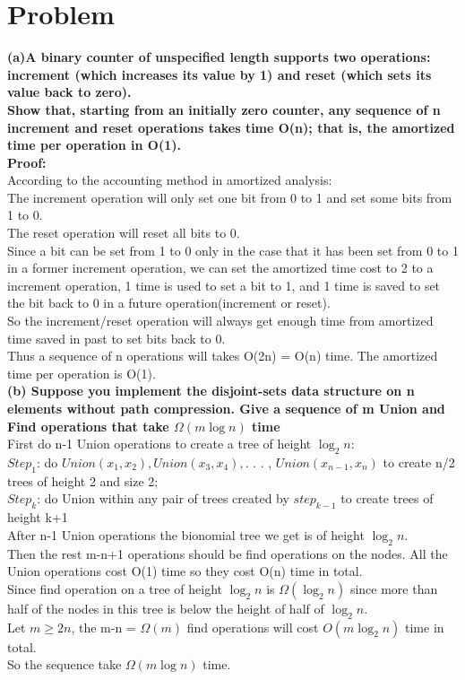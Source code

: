 \documentclass{article}
\begin{document}
\section{Problem \uppercase\expandafter{}}
\textbf{(a)A binary counter of unspecified length supports two operations: increment
(which increases its value by 1) and reset (which sets its value back to zero).\\
 Show that,
starting from an initially zero counter, any sequence of n increment and reset operations
takes time O(n); that is, the amortized time per operation in O(1).}\\
\textbf{Proof:}\\
According to the accounting method in amortized analysis:\\
The increment operation will only set one bit from 0 to 1 and set some bits from 1 to 0.\\
The reset operation will reset all bits to 0.\\
Since a bit can be set from 1 to 0 only in the case that it has been set from 0 to 1 in a former increment operation, we can set the amortized time cost to 2 to a increment operation, 1 time is used to set a bit to 1, and 1 time is saved to set the bit back to 0 in a future operation(increment or reset).\\
So the increment/reset operation will always get enough time from amortized time saved in past to set bits back to 0.\\
Thus a sequence of n operations will takes O(2n) = O(n) time. The amortized time per operation is O(1).\\
\textbf{(b) Suppose you implement the disjoint-sets data structure on n elements without path compression. Give a sequence of m Union and Find operations that take $\Omega(m \log n)$ time}\\
First do n-1 Union operations to create a tree of height $\log_2 n$:\\
$Step_1$: do $Union(x_1,x_2), Union(x_3,x_4),$. . . , $Union(x_{n-1},x_n)$ to create n/2 trees of height 2 and size 2;\\
$Step_k$: do Union within any pair of trees created by $step_{k-1}$ to create trees of height k+1\\
After n-1 Union operations the bionomial tree we get is of height $\log_2 n$.\\
Then the rest m-n+1 operations should be find operations on the nodes. All the Union operations cost O(1) time so they cost O(n) time in total.\\ 
Since find operation on a tree of height $\log_2 n$ is $\Omega(\log_2 n)$ since more than half of the nodes in this tree is below the height of half of $\log_2 n$.\\
Let $m \ge 2n$, the m-n = $\Omega(m)$ find operations will cost $O(m\log_2 n)$ time in total.\\
So the sequence take $\Omega(m \log n)$ time.\\
\end{document}
